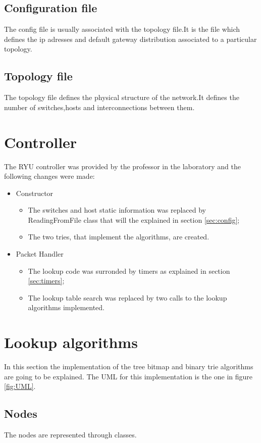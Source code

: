 \documentclass[]{report}
\begin{document}
\subsection{Configuration file}

The config file is usually associated with the topology file.It is the file which defines the ip adresses and default gateway distribution associated to a particular topology.

\subsection{Topology file}

The topology file defines the physical structure of the network.It defines the number of switches,hosts and interconnections between them.

\section{Controller}
The RYU controller was provided by the professor in the laboratory and the following changes were made:
\begin{itemize}
\item Constructor
\begin{itemize}
\item The switches and host static information was replaced by ReadingFromFile class that will the explained in section \ref{sec:config};
\item The two tries, that implement the algorithms, are created.
\end{itemize}
\item Packet Handler
\begin{itemize}
\item The lookup code was surronded by timers as explained in section \ref{sec:timers};
\item The lookup table search was replaced by two calls to the lookup algorithms implemented.
\end{itemize}
\end{itemize}


\section{Lookup algorithms}
In this section the implementation of the tree bitmap and binary trie algorithms are going to be explained. The UML for this implementation is the one in figure \ref{fig:UML}.

\subsection{Nodes}
The nodes are represented through classes.
\end{document}
